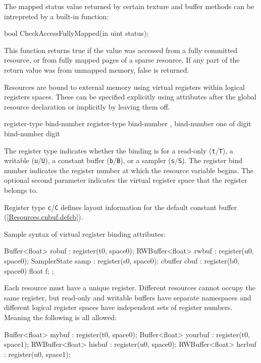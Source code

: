 

The mapped status value returned by certain texture and buffer methods can be
intrepreted by a built-in function:

\begin{HLSL}
  bool CheckAccessFullyMapped(in uint status);
\end{HLSL}

This function returns true if the value was accessed from a fully committed
resource, or from fully mapped pages of a sparse resource. If any part of the
return value was from unmapped memory, false is returned.


Resources are bound to external memory using virtual registers within logical registers spaces.
These can be specified explicitly using attributes after the global resource declaration
or implicitly by leaving them off.

\begin{grammar}
  \br
   register-type bind-number \terminal{)}\br
   register-type bind-number ,  bind-number \terminal{)}\br
   \textnormal{one of}\br
  \br
  \br
  digit\br
  bind-number digit\br
\end{grammar}

The register type indicates whether the binding is for a read-only
(\texttt{t}/\texttt{T}), a writable (\texttt{u}/\texttt{U}), a constant buffer
(\texttt{b}/\texttt{B}), or a sampler (\texttt{s}/\texttt{S}). The register bind
number indicates the register number at which the resource variable begins. The
optional second parameter indicates the virtual register space that the register
belongs to.

Register type \texttt{c}/\texttt{C} defines layout information for the default
constant buffer (\ref{Resources.cnbuf.defcb}).

Sample syntax of virtual register binding attributes:
\begin{HLSL}
  Buffer<float> robuf : register(t0, space0);
  RWBuffer<float> rwbuf : register(u0, space0);
  SamplerState samp : register(s0, space0);
  cbuffer cbuf : register(b0, space0) { float f; };
\end{HLSL}

Each resource must have a unique register. Different resources cannot occupy the same register,
but read-only and writable buffers have separate namespaces and different logical register spaces have independent
sets of register numbers. Meaning the following is all allowed:
\begin{HLSL}
  Buffer<float> mybuf : register(t0, space0);
  Buffer<float> yourbuf : register(t0, space1);
  RWBuffer<float> hisbuf : register(u0, space0);
  RWBuffer<float> herbuf : register(u0, space1);
\end{HLSL}

